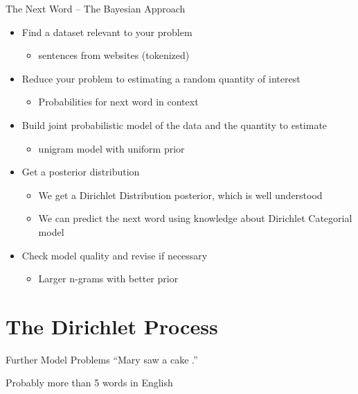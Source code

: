 \documentclass[11pt]{beamer}
\begin{document}
	\begin{frame}{The Next Word -- The Bayesian Approach}
		\centering
		\begin{itemize}
			\item Find a dataset relevant to your problem
			\begin{itemize}
				\item sentences from websites (tokenized) \checkmark
			\end{itemize}
			\item Reduce your problem to estimating a random quantity of interest
			\begin{itemize}
				\item Probabilities for next word in context \checkmark 
			\end{itemize}
			\item Build joint probabilistic model of the data and the quantity to estimate
			\begin{itemize}
				\item unigram model with uniform prior \checkmark
			\end{itemize}
			\item Get a posterior distribution
			\begin{itemize}
				\item We get a Dirichlet Distribution posterior, which is well understood \checkmark
				\item We can predict the next word using knowledge about Dirichlet Categorial model \checkmark
			\end{itemize}
			\item Check model quality and revise if necessary
			\begin{itemize}
				\item Larger n-grams with better prior \checkmark
			\end{itemize}
		\end{itemize}
	\end{frame}
	
	\section{The Dirichlet Process}
	
	\begin{frame}{Further Model Problems}
		``Mary saw a cake .''
		
		\vspace{10pt}Probably more than 5 words in English
	\end{frame}
	
\end{document}
